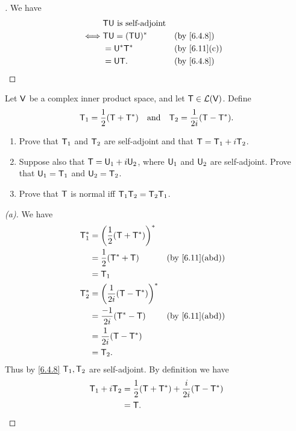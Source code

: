 \begin{proof}[]
	We have
	\begin{align*}
		     & \T \U \text{ is self-adjoint}                   \\
		\iff & \T \U = (\T \U)^*             &  & \by{6.4.8}   \\
		     & = \U^* \T^*                   &  & \by{6.11}[c] \\
		     & = \U \T.                      &  & \by{6.4.8}
	\end{align*}
\end{proof}

\setcounter{ex}{5}
\begin{ex}\label{ex:6.4.6}
	Let \(\mathsf{V}\) be a complex inner product space, and let \(\mathsf{T} \in \mathcal{L}(\mathsf{V})\).
	Define
	\[
		\mathsf{T}_1 = \frac{1}{2} (\mathsf{T} + \mathsf{T}^*) \quad \text{and} \quad \mathsf{T}_2 = \frac{1}{2i} (\mathsf{T} - \mathsf{T}^*).
	\]
	\begin{enumerate}
		\item Prove that \(\mathsf{T}_1\) and \(\mathsf{T}_2\) are self-adjoint and that \(\mathsf{T} = \mathsf{T}_1 + i \mathsf{T}_2\).
		\item Suppose also that \(\mathsf{T} = \mathsf{U}_1 + i \mathsf{U}_2\), where \(\mathsf{U}_1\) and \(\mathsf{U}_2\) are self-adjoint.
		      Prove that \(\mathsf{U}_1 = \mathsf{T}_1\) and \(\mathsf{U}_2 = \mathsf{T}_2\).
		\item Prove that \(\mathsf{T}\) is normal iff \(\mathsf{T}_1 \mathsf{T}_2 =  \mathsf{T}_2 \mathsf{T}_1\).
	\end{enumerate}
\end{ex}

\begin{proof}[(a)]
	We have
	\begin{align*}
		\T_1^* & = \pa{\frac{1}{2} (\T + \T^*)}^*                      \\
		       & = \frac{1}{2} (\T^* + \T)         &  & \by{6.11}[abd] \\
		       & = \T_1                                                \\
		\T_2^* & = \pa{\frac{1}{2i} (\T - \T^*)}^*                     \\
		       & = \frac{-1}{2i} (\T^* - \T)       &  & \by{6.11}[abd] \\
		       & = \frac{1}{2i} (\T - \T^*)                            \\
		       & = \T_2.
	\end{align*}
	Thus by \cref{6.4.8} \(\mathsf{T}_1, \mathsf{T}_2\) are self-adjoint.
	By definition we have
	\begin{align*}
		\mathsf{T}_1 + i \mathsf{T}_2 & = \frac{1}{2} (\mathsf{T} + \mathsf{T}^*) + \frac{i}{2i} (\mathsf{T} - \mathsf{T}^*) \\
		              & = \mathsf{T}.
	\end{align*}
\end{proof}

